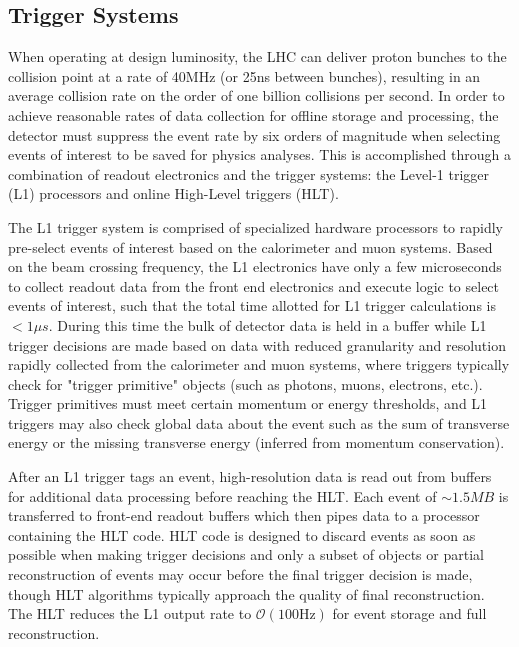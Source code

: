 
 
\subsection{Trigger Systems}
\label{subsec:triggers}
When operating at design luminosity, the LHC can deliver proton bunches to the collision point at a rate of 40MHz (or 25ns between bunches), resulting in an average collision rate on the order of one billion collisions per second. In order to achieve reasonable rates of data collection for offline storage and processing, the detector must suppress the event rate by six orders of magnitude when selecting events of interest to be saved for physics analyses. This is accomplished through a combination of readout electronics and the trigger systems: the Level-1 trigger (L1) processors and online High-Level triggers (HLT).

The L1 trigger system is comprised of specialized hardware processors to rapidly pre-select events of interest based on the calorimeter and muon systems. Based on the beam crossing frequency, the L1 electronics have only a few microseconds to collect readout data from the front end electronics and execute logic to select events of interest, such that the total time allotted for L1 trigger calculations is $<1\mu s$. During this time the bulk of detector data is held in a buffer while L1 trigger decisions are made based on data with reduced granularity and resolution rapidly collected from the calorimeter and muon systems, where triggers typically check for "trigger primitive" objects (such as photons, muons, electrons, etc.). Trigger primitives must meet certain momentum or energy thresholds, and L1 triggers may also check global data about the event such as the sum of transverse energy or the missing transverse energy (inferred from momentum conservation). 

After an L1 trigger tags an event, high-resolution data is read out from buffers for additional data processing before reaching the HLT. Each event of $\sim1.5MB$ is transferred to front-end readout buffers which then pipes data to a processor containing the HLT code. HLT code is designed to discard events as soon as possible when making trigger decisions and only a subset of objects or partial reconstruction of events may occur before the final trigger decision is made, though HLT algorithms typically approach the quality of final reconstruction. The HLT reduces the L1 output rate to $\mathcal{O}(100\text{Hz})$ for event storage and full reconstruction.
